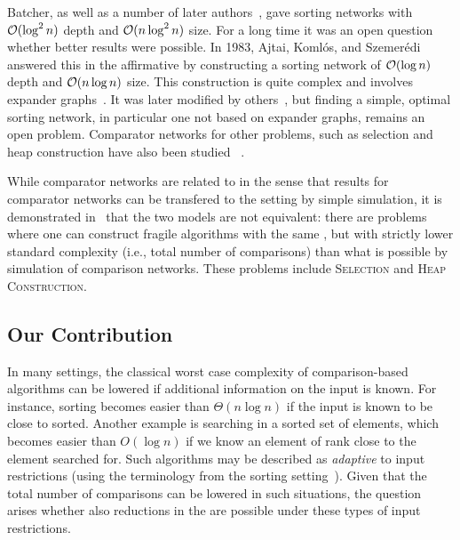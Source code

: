 Batcher, as well as a number of later
authors~\cite{Dowd-Perl-Rudolph-Saks/89,Parberry/92,IPL::ParkerP1989,books/garland/Pratt72}, gave sorting networks with
$\mathcal{O}(\log^2 n)$ depth and $\mathcal{O}(n\log^2 n)$ size.
For a long time it was an open question whether better results were
possible. In 1983, Ajtai, Koml{\'o}s, and
Szemer{\'e}di~\cite{aks-halvers,aks} answered this in the affirmative
by constructing a sorting network of $\mathcal{O}(\log n)$ depth and
$\mathcal{O}(n\log n)$ size. This construction is quite complex and involves
expander graphs~\cite{HooLinWig06,journals/fttcs/Vadhan12}. It was
later modified by
others~\cite{Chvatal/92,conf/stoc/Goodrich14,Paterson/90,journals/algorithmica/Seiferas09},
but finding a simple, optimal sorting network, in particular one not
based on expander graphs, remains an open problem.  Comparator
networks for other problems, such as selection and heap construction
have also been studied
~\cite{alekseev:selection-69,brodal:heap-98,Jimbo,Pippenger91,Yao.merging}.

While comparator networks are related to \frag in the sense that
results for comparator networks can be transfered to the \frag setting by
simple simulation, it is demonstrated in~\cite{afshani:fragile-ESA19}
that the two models are not equivalent: there are problems where one
can construct fragile algorithms with the same \frag, but with
strictly lower standard complexity (i.e., total number of comparisons)
than what is possible by simulation of comparison networks. These
problems include \textsc{Selection} and \textsc{Heap Construction}.

\subsection{Our Contribution}
In many settings, the classical worst case complexity of
comparison-based algorithms can be lowered if additional information
on the input is known. For instance, sorting becomes easier than
$\Theta(n \log n)$ if the input is known to be close to
sorted. Another example is searching in a sorted set of elements,
which becomes easier than $O(\log n)$ if we know an element of rank
close to the element searched for. Such algorithms may be described as
\emph{adaptive} to input restrictions (using the terminology from the
sorting setting~\cite{DBLP:journals/csur/Estivill-CastroW92}). Given
that the total number of comparisons can be lowered in such
situations, the question arises whether also reductions in the \frag
are possible under these types of input restrictions.

